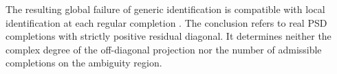 \documentclass[11pt,a4paper]{amsart}
\begin{document}
The resulting global failure of generic identification is compatible with local identification at each regular completion \cite{shapiro}. The conclusion refers to real PSD completions with strictly positive residual diagonal. It determines neither the complex degree of the off-diagonal projection nor the number of admissible completions on the ambiguity region.



\end{document}
